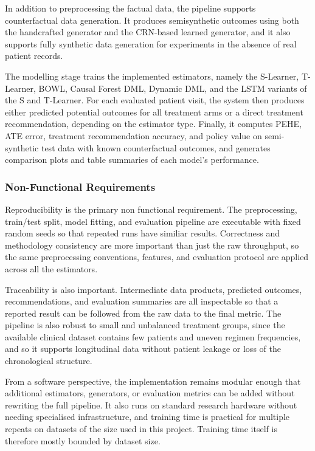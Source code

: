 \documentclass{article}
\begin{document}
In addition to preprocessing the factual data, the pipeline supports counterfactual data generation. It produces semisynthetic outcomes using both the handcrafted generator and the CRN-based learned generator, and it also supports fully synthetic data generation for experiments in the absence of real patient records.

The modelling stage trains the implemented estimators, namely the S-Learner, T-Learner, BOWL, Causal Forest DML, Dynamic DML, and the LSTM variants of the S and T-Learner. For each evaluated patient visit, the system then produces either predicted potential outcomes for all treatment arms or a direct treatment recommendation, depending on the estimator type. Finally, it computes PEHE, ATE error, treatment recommendation accuracy, and policy value on semi-synthetic test data with known counterfactual outcomes, and generates comparison plots and table summaries of each model's performance.

\subsubsection{Non-Functional Requirements}
Reproducibility is the primary non functional requirement. The preprocessing, train/test split, model fitting, and evaluation pipeline are executable with fixed random seeds so that repeated runs have similiar results. Correctness and methodology consistency are more important than just the raw throughput, so the same preprocessing conventions, features, and evaluation protocol are applied across all the estimators.

Traceability is also important. Intermediate data products, predicted outcomes, recommendations, and evaluation summaries are all inspectable so that a reported result can be followed from the raw data to the final metric. The pipeline is also robust to small and unbalanced treatment groups, since the available clinical dataset contains few patients and uneven regimen frequencies, and so it supports longitudinal data without patient leakage or loss of the chronological structure.

From a software perspective, the implementation remains modular enough that additional estimators, generators, or evaluation metrics can be added without rewriting the full pipeline. It also runs on standard research hardware without needing specialised infrastructure, and training time is practical for multiple repeats on datasets of the size used in this project. Training time itself is therefore mostly bounded by dataset size.
\end{document}
